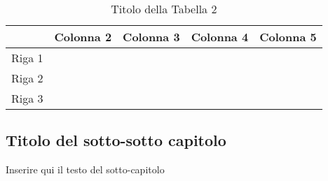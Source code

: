 \begin{table}[H]
    \centering
    \begin{tabular}{c c c c c}
        \hline
        \textbf{} & \textbf{Colonna 2} & \textbf{Colonna 3} & \textbf{Colonna 4} & \textbf{Colonna 5}\\
        \hline
        Riga 1 &  &  &  &\\
        Riga 2 &  &  &  &\\
        Riga 3 &  &  &  &\\
    \end{tabular}
    \caption{Titolo della Tabella 2}
    \label{tab:esempio-tabella-2}
\end{table}

\subsection{Titolo del sotto-sotto capitolo}
Inserire qui il testo del sotto-capitolo

